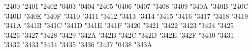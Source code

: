 
\def\amsafam{4} \def\amsbfam{5} 


\mathchardef \boxdot   "2\amsafam 00
\mathchardef \boxplus   "2\amsafam 01
\mathchardef \boxtimes   "2\amsafam 02
\mathchardef \square   "0\amsafam 03
\mathchardef \blacksquare   "0\amsafam 04
\mathchardef \centerdot   "2\amsafam 05
\mathchardef \lozenge   "0\amsafam 06
\mathchardef \blacklozenge   "0\amsafam 07
\mathchardef \circlearrowright   "3\amsafam 08
\mathchardef \circlearrowleft   "3\amsafam 09
\mathchardef \rightleftharpoons   "3\amsafam 0A
\mathchardef \leftrightharpoons   "3\amsafam 0B
\mathchardef \boxminus   "2\amsafam 0C
\mathchardef \Vdash   "3\amsafam 0D
\mathchardef \Vvdash   "3\amsafam 0E
\mathchardef \vDash   "3\amsafam 0F
\mathchardef \twoheadrightarrow   "3\amsafam 10
\mathchardef \twoheadleftarrow   "3\amsafam 11
\mathchardef \leftleftarrows   "3\amsafam 12
\mathchardef \rightrightarrows   "3\amsafam 13
\mathchardef \upuparrows   "3\amsafam 14
\mathchardef \downdownarrows   "3\amsafam 15
\mathchardef \upharpoonright   "3\amsafam 16
\mathchardef \downharpoonright   "3\amsafam 17
\mathchardef \upharpoonleft   "3\amsafam 18
\mathchardef \downharpoonleft   "3\amsafam 19
\mathchardef \rightarrowtail   "3\amsafam 1A
\mathchardef \leftarrowtail   "3\amsafam 1B
\mathchardef \leftrightarrows   "3\amsafam 1C
\mathchardef \rightleftarrows   "3\amsafam 1D
\mathchardef \Lsh   "3\amsafam 1E
\mathchardef \Rsh   "3\amsafam 1F
\mathchardef \rightsquigarrow   "3\amsafam 20
\mathchardef \leftrightsquigarrow   "3\amsafam 21
\mathchardef \looparrowleft   "3\amsafam 22
\mathchardef \looparrowright   "3\amsafam 23
\mathchardef \circeq   "3\amsafam 24
\mathchardef \succsim   "3\amsafam 25
\mathchardef \gtrsim   "3\amsafam 26
\mathchardef \gtrapprox   "3\amsafam 27
\mathchardef \multimap   "3\amsafam 28
\mathchardef \therefore   "3\amsafam 29
\mathchardef \because   "3\amsafam 2A
\mathchardef \doteqdot   "3\amsafam 2B
\mathchardef \triangleq   "3\amsafam 2C
\mathchardef \precsim   "3\amsafam 2D
\mathchardef \lesssim   "3\amsafam 2E
\mathchardef \lessapprox   "3\amsafam 2F
\mathchardef \eqslantless   "3\amsafam 30
\mathchardef \eqslantgtr   "3\amsafam 31
\mathchardef \curlyeqprec   "3\amsafam 32
\mathchardef \curlyeqsucc   "3\amsafam 33
\mathchardef \preccurlyeq   "3\amsafam 34
\mathchardef \leqq   "3\amsafam 35
\mathchardef \leqslant   "3\amsafam 36
\mathchardef \lessgtr   "3\amsafam 37
\mathchardef \backprime   "0\amsafam 38
\mathchardef \risingdotseq   "3\amsafam 3A
